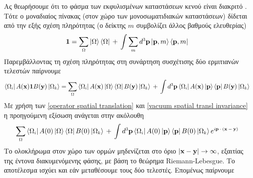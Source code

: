 Ας θεωρήσουμε ότι το φάσμα των εκφυλισμένων καταστάσεων κενού είναι διακριτό \cite{weinberg_1996}. Τότε ο μοναδιαίος πίνακας (στον χώρο των μονοσωματιδιακών καταστάσεων) δίδεται από την εξής σχέση πληρότητας 
(ο δείκτης $m$ συμβολίζει άλλος βαθμούς ελευθερίας) 
\begin{equation}
    \mathbf{1}=\sum\subscr{\Omega}\left|\Omega\right>\left<\Omega\right|\,+\,\int \sum\subscr{m}d\superscr{3}\mathbf{p}\left|\mathbf{p},m\right>\left<\mathbf{p},m\right|
\end{equation}
Παρεμβάλλοντας τη σχέση πληρότητας στη συνάρτηση συσχέτισης 
δύο ερμιτιανών τελεστών παίρνουμε
\begin{equation}
    \left<\Omega\subscr{i}\right|A(\mathbf{x})\mathbf{1}B(\mathbf{\text{\textbf{y}}})\left|\Omega\subscr{k}\right>=\sum\subscr{\Omega} \left<\Omega\subscr{i}\right|A(\mathbf{x})\left|\Omega\right>\left<\Omega\right|B(\mathbf{\text{\textbf{y}}})\left|\Omega\subscr{k}\right>\,+\,\int d\superscr{3}\mathbf{p}\left<\Omega\subscr{i}\right|A(\mathbf{x})\left|\mathbf{p}\right>\left<\mathbf{p}\right|B(\mathbf{\text{\textbf{y}}})\left|\Omega\subscr{k}\right>
\end{equation}
Με χρήση των \eqref{operator spatial translation} και \eqref{vacuum spatial transl invariance} η προηγούμενη εξίσωση ανάγεται στην ακόλουθη
\begin{equation}
    \sum\subscr{\Omega} \left<\Omega\subscr{i}\right|A(0)\left|\Omega\right>\left<\Omega\right|B(0)\left|\Omega\subscr{k}\right>\,+\,\int d\superscr{3}\mathbf{p}\left<\Omega\subscr{i}\right|A(0)\left|\mathbf{p}\right>\left< \mathbf{p}\right|B(0)\left|\Omega\subscr{k}\right>e\superscr{i\mathbf{p}\cdot(\mathbf{x}-\mathbf{y})}
\end{equation}
Το ολοκλήρωμα στον χώρο των ορμών μηδενίζεται στο όριο $|\mathbf{x}-\text{\textbf{y}}|\rightarrow\infty$, εξαιτίας της έντονα διακυμενόμενης φάσης, 
με βάση το θεώρημα Riemann-Lebesgue. Το αποτέλεσμα ισχύει και εάν μεταθέσουμε τους δύο τελεστές. Επομένως παίρνουμε
